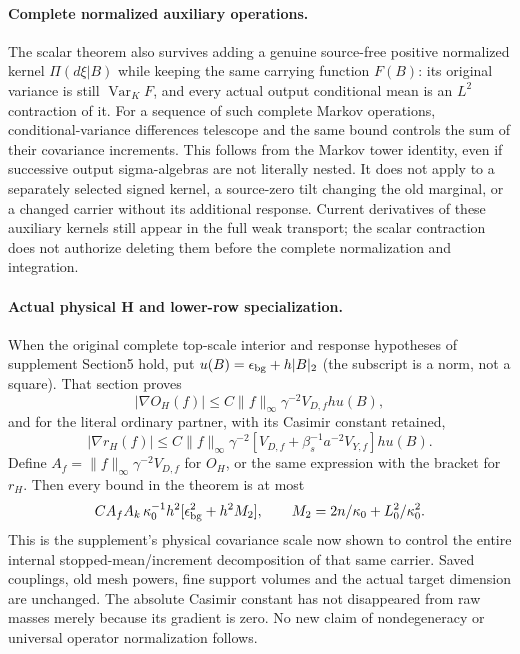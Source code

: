 \documentclass[11pt]{article}
\newcommand{\Var}{\operatorname{Var}}
\begin{document}
\paragraph{Complete normalized auxiliary operations.}
The scalar theorem also survives adding a genuine source-free positive normalized kernel
$\Pi(d\xi|B)$ while keeping the same carrying function $F(B)$: its original variance is
still $\Var_KF$, and every actual output conditional mean is an $L^2$ contraction of it.
For a sequence of such complete Markov operations, conditional-variance differences telescope
and the same bound controls the sum of their covariance increments. This follows from the
Markov tower identity, even if successive output sigma-algebras are not literally nested.
It does not apply to a separately selected signed kernel, a source-zero tilt changing the
old marginal, or a changed carrier without its additional response. Current derivatives of
these auxiliary kernels still appear in the full weak transport; the scalar contraction does
not authorize deleting them before the complete normalization and integration.

\paragraph{Actual physical H and lower-row specialization.}
When the original complete top-scale interior and response hypotheses of supplement
Section5 hold, put $u(B)=\epsilon_{\rm bg}+h|B|_2$ (the subscript is a norm, not a square).
That section proves
\[
 |\nabla O_H(f)|\le C\|f\|_\infty\gamma^{-2}V_{D,f}h u(B),
\]
and for the literal ordinary partner, with its Casimir constant retained,
\[
 |\nabla r_H(f)|\le C\|f\|_\infty\gamma^{-2}
 [V_{D,f}+\beta_s^{-1}a^{-2}V_{Y,f}]h u(B).
\]
Define $A_f=\|f\|_\infty\gamma^{-2}V_{D,f}$ for $O_H$, or the same expression with
the bracket for $r_H$. Then every bound in the theorem is at most
\[
 C A_f A_k\,\kappa_0^{-1}h^2
       [\epsilon_{\rm bg}^2+h^2M_2],\qquad
 M_2=2n/\kappa_0+L_0^2/\kappa_0^2.
\]
This is the supplement's physical covariance scale now shown to control the entire
internal stopped-mean/increment decomposition of that same carrier. Saved couplings,
old mesh powers, fine support volumes and the actual target dimension are unchanged.
The absolute Casimir constant has not disappeared from raw masses merely because its
gradient is zero. No new claim of nondegeneracy or universal operator normalization follows.
\end{document}
